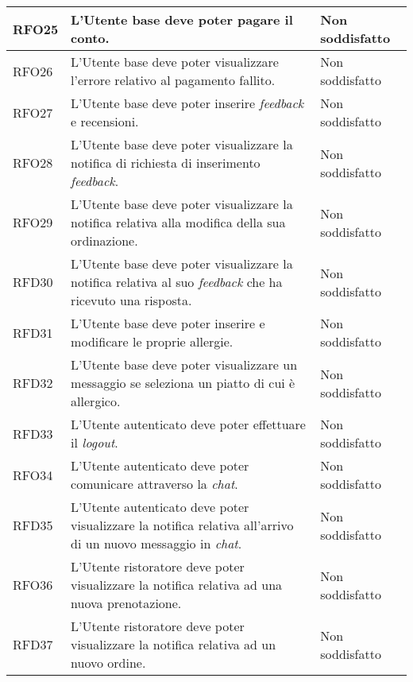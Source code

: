 \begin{longtable}{|l|p{}|p{3cm}|}
	\hline
	RFO25       & L'Utente base deve poter pagare il conto.                                                                               & Non soddisfatto \\
	\hline
	RFO26       & L'Utente base deve poter visualizzare l'errore relativo al pagamento fallito.                                           & Non soddisfatto \\
	\hline
	RFO27       & L'Utente base deve poter inserire \textit{feedback} e recensioni.                                                       & Non soddisfatto \\
	\hline
	RFO28       & L'Utente base deve poter visualizzare la notifica di richiesta di inserimento \textit{feedback}.                        & Non soddisfatto \\
	\hline
	RFO29       & L'Utente base deve poter visualizzare la notifica relativa alla modifica della sua ordinazione.                         & Non soddisfatto \\
	\hline
	RFD30       & L'Utente base deve poter visualizzare la notifica relativa al suo \textit{feedback} che ha ricevuto una risposta.       & Non soddisfatto \\
	\hline
	RFD31       & L'Utente base deve poter inserire e modificare le proprie allergie.                                                     & Non soddisfatto \\
	\hline
	RFD32       & L'Utente base deve poter visualizzare un messaggio se seleziona un piatto di cui è allergico.                           & Non soddisfatto \\
	\hline
	RFD33       & L'Utente autenticato deve poter effettuare il \textit{logout}.                                                          & Non soddisfatto \\
	\hline
	RFO34       & L'Utente autenticato deve poter comunicare attraverso la \textit{chat}.                                                 & Non soddisfatto \\
	\hline
	RFD35       & L'Utente autenticato deve poter visualizzare la notifica relativa all'arrivo di un nuovo messaggio in \textit{chat}.    & Non soddisfatto \\
	\hline
	RFO36       & L'Utente ristoratore deve poter visualizzare la notifica relativa ad una nuova prenotazione.                            & Non soddisfatto \\
	\hline
	RFD37       & L'Utente ristoratore deve poter visualizzare la notifica relativa ad un nuovo ordine.                                   & Non soddisfatto \\

\end{longtable}
